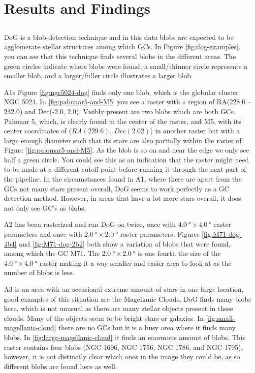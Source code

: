 \chapter{\label{chap:results}Results and Findings}

\section{\blobdog{}}

DoG is a blob-detection technique and in this data blobs are expected to be agglomerate stellar structures among which GCs.
In Figure \ref{fig:dog-examples}, you can see that this technique finds several blobs in the different areas. The green circles indicate where blobs were found, a small/thinner circle represents a smaller blob, and a larger/fuller circle illustrates a larger blob.

A1s Figure \ref{fig:ngc5024-dog} finds only one blob, which is the globular cluster NGC 5024. In \ref{fig:palomar5-and-M5} you see a raster with a region of RA(228.0 -- 232.0) and Dec(-2.0, 2.0). Visibly present are two blobs which are both GCs. Palomar 5, which, is clearly found in the center of the raster, and M5, with its center coordinates of ($RA(229.6)$, $Dec(2.02)$) in another raster but with a large enough diameter such that its stars are also partially within the raster of Figure \ref{fig:palomar5-and-M5}. As the blob is so on and near the edge we only see half a green circle. You could see this as an indication that the raster might need to be made at a different cutoff point before running it through the next part of the pipeline. In the circumstances found in A1, where there are apart from the GCs not many stars present overall, DoG seems to work perfectly as a GC detection method. However, in areas that have a lot more stars overall, it does not only see GC's as blobs.

A2 has been rasterized and run DoG on twice, once with $\SI{4.0}{\degree}\times\SI{4.0}{\degree}$ raster parameters and once with $\SI{2.0}{\degree}\times\SI{2.0}{\degree}$ raster parameters. Figures \ref{fig:M71-dog-4b4} and \ref{fig:M71-dog-2b2} both show a variation of blobs that were found, among which the GC M71. The $\SI{2.0}{\degree}\times\SI{2.0}{\degree}$  is one fourth the size of the $\SI{4.0}{\degree}\times\SI{4.0}{\degree}$ raster making it a way smaller and easier area to look at as the number of blobs is less.

A3 is an area with an occasional extreme amount of stars in one large location, good examples of this situation are the Magellanic Clouds. DoG finds many blobs here, which is not unusual as there are many stellar objects present in these clouds. Many of the objects seem to be bright stars or galaxies. In \ref{fig:small-magellanic-cloud} there are no GCs but it is a busy area where it finds many blobs. In \ref{fig:large-magellanic-cloud} it finds an enormous amount of blobs. This raster contains four blobs (NGC 1696, NGC 1756, NGC 1786, and NGC 1795), however, it is not distinctly clear which ones in the image they could be, as so different blobs are found here as well.

